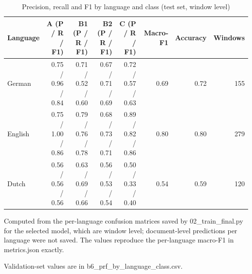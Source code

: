 \begin{table}[htbp]
\centering
\scriptsize\setlength{\tabcolsep}{3pt}
\begin{threeparttable}
\caption{Precision, recall and F1 by language and class (test set, window level)}
\label{tab:clf-prf}
\begin{tabular}{lrrrrrrr}
\hline
Language & A (P / R / F1) & B1 (P / R / F1) & B2 (P / R / F1) & C (P / R / F1) & Macro-F1 & Accuracy & Windows \\
\hline
German & 0.75 / 0.96 / 0.84 & 0.71 / 0.52 / 0.60 & 0.67 / 0.71 / 0.69 & 0.72 / 0.57 / 0.63 & 0.69 & 0.72 & 155 \\
English & 0.75 / 1.00 / 0.86 & 0.79 / 0.76 / 0.78 & 0.68 / 0.73 / 0.71 & 0.89 / 0.82 / 0.86 & 0.80 & 0.80 & 279 \\
Dutch & 0.56 / 0.56 / 0.56 & 0.63 / 0.69 / 0.66 & 0.56 / 0.53 / 0.54 & 0.50 / 0.33 / 0.40 & 0.54 & 0.59 & 120 \\
\hline
\end{tabular}
\begin{tablenotes}
\footnotesize
\item Computed from the per-language confusion matrices saved by 02\_train\_final.py for the selected model, which are window level; document-level predictions per language were not saved. The values reproduce the per-language macro-F1 in metrics.json exactly.
\item Validation-set values are in b6\_prf\_by\_language\_class.csv.
\end{tablenotes}
\end{threeparttable}
\end{table}
